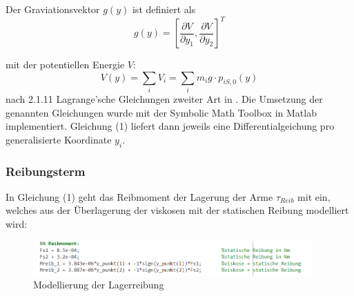 Der Graviationsvektor $g(y)$ ist definiert als
\begin{equation}
	g(y) = \left[ 
			\frac{\partial{V}}{\partial{y_{1}}} , 
			\frac{\partial{V}}{\partial{y_{2}}}
	\right]^{T}
\end{equation}

mit der potentiellen Energie $V$:
\begin{equation}
	V(y) = \sum_{i}V_{i} = \sum_{i}m_{i}g \cdot p_{iS,0}(y) 
\end{equation}
nach 2.1.11 Lagrange'sche Gleichungen zweiter Art in \cite{Fehr23}.
Die Umsetzung der genannten Gleichungen wurde mit der Symbolic Math Toolbox in Matlab implementiert.
Gleichung (1) liefert dann jeweils eine Differentialgeichung pro generalisierte Koordinate $y_{i}$.



\subsubsection*{Reibungsterm}
In Gleichung (1) geht das Reibmoment der Lagerung der Arme $\tau_{Reib}$ mit ein, welches aus der Überlagerung der viskosen mit der 
statischen Reibung modelliert wird:

\begin{figure}[H]
	\centering
	\includegraphics[width=0.95\textwidth]{Reibung.png}
	\caption{Modellierung der Lagerreibung}
\end{figure}
